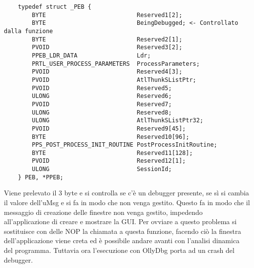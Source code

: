 \documentclass[a4paper,10pt]{article}
\begin{document}
\begin{verbatim}
	typedef struct _PEB {
		BYTE                          Reserved1[2];
		BYTE                          BeingDebugged; <- Controllato dalla funzione
		BYTE                          Reserved2[1];
		PVOID                         Reserved3[2];
		PPEB_LDR_DATA                 Ldr;
		PRTL_USER_PROCESS_PARAMETERS  ProcessParameters;
		PVOID                         Reserved4[3];
		PVOID                         AtlThunkSListPtr;
		PVOID                         Reserved5;
		ULONG                         Reserved6;
		PVOID                         Reserved7;
		ULONG                         Reserved8;
		ULONG                         AtlThunkSListPtr32;
		PVOID                         Reserved9[45];
		BYTE                          Reserved10[96];
		PPS_POST_PROCESS_INIT_ROUTINE PostProcessInitRoutine;
		BYTE                          Reserved11[128];
		PVOID                         Reserved12[1];
		ULONG                         SessionId;
	} PEB, *PPEB;
\end{verbatim}

 Viene prelevato il 3 byte e si controlla se c'è un debugger presente, se sì si cambia il valore dell'uMsg e si fa in modo che non venga gestito. Questo fa in modo che il messaggio di creazione delle finestre non venga gestito, impedendo all'applicazione di creare e mostrare la GUI. Per ovviare a questo problema si sostituisce con delle NOP la chiamata a questa funzione, facendo ciò la finestra dell'applicazione viene creta ed è possibile andare avanti con l'analisi dinamica del programma. Tuttavia ora l'esecuzione con OllyDbg porta ad un crash del debugger.
\end{document}
